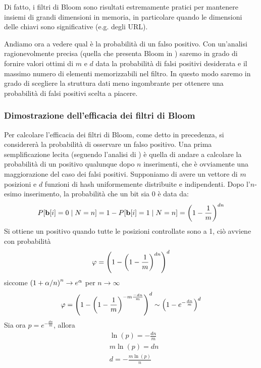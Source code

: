 Di fatto, i filtri di Bloom sono risultati estremamente pratici per mantenere insiemi di grandi dimensioni in memoria, in particolare quando le dimensioni delle chiavi sono significative (e.g. degli URL).

Andiamo ora a vedere qual è la probabilità di un falso positivo. Con un'analisi ragionevolmente precisa (quella che presenta Bloom in \cite{Bloom}) saremo in grado di fornire valori ottimi di $m$ e $d$ data la probabilità di falsi positivi desiderata e il massimo numero di elementi memorizzabili nel filtro. In questo modo saremo in grado di scegliere la struttura dati meno ingombrante per ottenere una probabilità di falsi positivi scelta a piacere.

\subsubsection{Dimostrazione dell'efficacia dei filtri di Bloom}
Per calcolare l'efficacia dei filtri di Bloom, come detto in precedenza, si considererà la probabilità di osservare un falso positivo. Una prima semplificazione lecita (seguendo l'analisi di \cite{Bloom}) è quella di andare a calcolare la probabilità di un positivo qualunque dopo $n$ inserimenti, che è ovviamente una maggiorazione del caso dei falsi positivi.
Supponiamo di avere un vettore di $m$ posizioni e $d$ funzioni di hash uniformemente distribuite e indipendenti. Dopo l'$n$-esimo inserimento, la probabilità che un bit sia 0 è data da:
\begin{equation*}
    P[\textbf{b}[i] = 0 \hspace{1mm}|\hspace{1mm} N = n] = 1 - P[\textbf{b}[i] = 1 \hspace{1mm}|\hspace{1mm} N = n] = \left(1 - \frac{1}{m}\right)^{dn}
\end{equation*}
Si ottiene un positivo quando tutte le posizioni controllate sono a 1, ciò avviene con probabilità
\begin{equation*}
    \varphi = \left(1 - \left(1 - \frac{1}{m}\right)^{dn}\right)^d
\end{equation*}
siccome $\left(1 + \alpha/n\right)^n \rightarrow e^{\alpha}$ per $n \rightarrow \infty$
\begin{equation*}
    \varphi = \left(1 - \left(1 - \frac{1}{m}\right)^{-m \frac{-dn}{m}}\right)^d \sim \left(1 - e^{-\frac{dn}{m}}\right)^d
\end{equation*}
Sia ora $p = e^{-\frac{dn}{m}}$, allora
\begin{align*}
    &\ln(p) = -\frac{dn}{m}\\
    &m\ln(p) = dn\\
    &d = -\frac{m\ln(p)}{n}
\end{align*}
